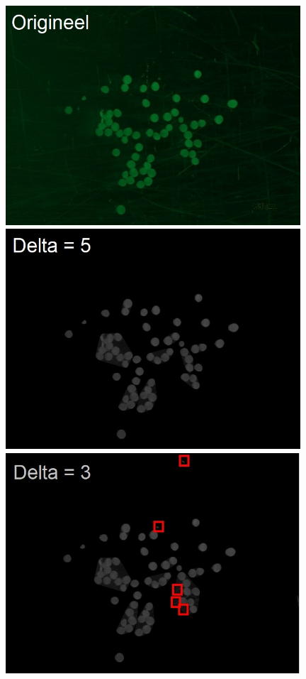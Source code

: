 \documentclass{article}
\begin{document}
\begin{multicols}{2}
\begin{figure}[H]
\centering
\includegraphics[width=0.98\textwidth]{images/delta_orig.jpg}
\includegraphics[width=0.98\textwidth]{images/delta_5.jpg}
\includegraphics[width=0.98\textwidth]{images/delta_3.jpg}

\end{figure}
\end{multicols}
\end{document}
